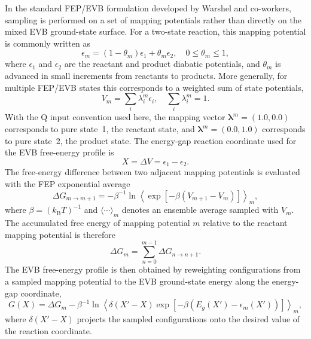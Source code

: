 In the standard FEP/EVB formulation developed by Warshel and co-workers, sampling is performed on a set of mapping potentials rather than directly on the mixed EVB ground-state surface.\cite{warshel_empirical_1980,Warshel2006,Kamerlin2010,oanca_efficient_2023} For a two-state reaction, this mapping potential is commonly written as
\begin{equation}
\epsilon_m=(1-\theta_m)\epsilon_1+\theta_m\epsilon_2,
\quad 0\leq\theta_m\leq 1,
\label{eq:emapping_general}
\end{equation}
where $\epsilon_1$ and $\epsilon_2$ are the reactant and product diabatic potentials, and $\theta_m$ is advanced in small increments from reactants to products.\cite{marelius_q_1999,oanca_efficient_2023} More generally, for multiple FEP/EVB states this corresponds to a weighted sum of state potentials,
\begin{equation}
V_m=\sum_i \lambda_i^m\epsilon_i,
\quad \sum_i\lambda_i^m=1.
\label{eq:emapping_two_state}
\end{equation}
With the Q input convention used here, the mapping vector $\boldsymbol{\lambda}^m=(1.0,0.0)$ corresponds to pure state~1, the reactant state, and $\boldsymbol{\lambda}^m=(0.0,1.0)$ corresponds to pure state~2, the product state. The energy-gap reaction coordinate used for the EVB free-energy profile is
\begin{equation}
X=\Delta V=\epsilon_1-\epsilon_2.
\label{eq:energy_gap}
\end{equation}
The free-energy difference between two adjacent mapping potentials is evaluated with the FEP exponential average
\begin{equation}
\Delta G_{m\rightarrow m+1}
=-\beta^{-1}\ln
\left\langle
\exp\left[-\beta\left(V_{m+1}-V_m\right)\right]
\right\rangle_m,
\label{eq:fep_zwanzig}
\end{equation}
where $\beta=(k_{\mathrm{B}}T)^{-1}$ and $\langle\cdots\rangle_m$ denotes an ensemble average sampled with $V_m$. The accumulated free energy of mapping potential $m$ relative to the reactant mapping potential is therefore
\begin{equation}
\Delta G_m=
\sum_{n=0}^{m-1}\Delta G_{n\rightarrow n+1}.
\label{eq:fep_cumulative}
\end{equation}
The EVB free-energy profile is then obtained by reweighting configurations from a sampled mapping potential to the EVB ground-state energy along the energy-gap coordinate,
\begin{equation}
G(X)=
\Delta G_m
-\beta^{-1}\ln
\left\langle
\delta(X'-X)
\exp\left[-\beta\left(E_g(X')-\epsilon_m(X')\right)\right]
\right\rangle_m,
\label{eq:evb_reweighting}
\end{equation}
where $\delta(X'-X)$ projects the sampled configurations onto the desired value of the reaction coordinate.\cite{marelius_q_1999} 

